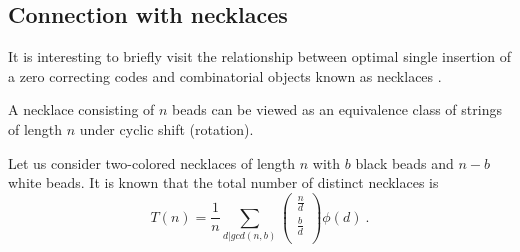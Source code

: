 \subsection{Connection with necklaces}

It is interesting to briefly visit the relationship between
optimal single insertion of a zero correcting codes and
combinatorial objects known as necklaces \cite{GR61}.

A necklace consisting of $n$ beads can be viewed as an equivalence
class of strings of length $n$ under cyclic shift (rotation).

Let us consider two-colored necklaces of length $n$ with $b$ black
beads and $n-b$ white beads. It is known that the total number of
distinct necklaces is
\begin{equation}
T(n)=\frac{1}{n} \sum_{d|gcd(n,b)} \left( \begin{array}{c}
                             \frac{n}{d} \\
                             \frac{b}{d} \\
                           \end{array} \right)\phi(d)~.
\end{equation}

